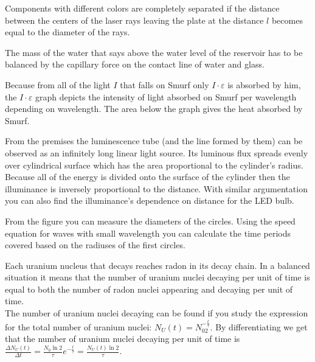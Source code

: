 \documentclass[11pt]{article}
\begin{document}
\hinteng
Components with different colors are completely separated if the distance between the centers of the laser rays leaving the plate at the distance $l$ becomes equal to the diameter of the rays.
\probend
\bigskip


\hinteng
The mass of the water that says above the water level of the reservoir has to be balanced by the capillary force on the contact line of water and glass.
\probend
\bigskip


\hinteng
Because from all of the light $I$ that falls on Smurf only $ I \cdot\varepsilon $ is absorbed by him, the $ I \cdot \varepsilon $ graph depicts the intensity of light absorbed on Smurf per wavelength depending on wavelength. The area below the graph gives the heat absorbed by Smurf.
\probend
\bigskip


\hinteng
From the premises the luminescence tube (and the line formed by them) can be observed as an infinitely long linear light source. Its luminous flux spreads evenly over cylindrical surface which has the area proportional to the cylinder’s radius. Because all of the energy is divided onto the surface of the cylinder then the illuminance is inversely proportional to the distance. With similar argumentation you can also find the illuminance’s dependence on distance for the LED bulb.
\probend
\bigskip


\hinteng
From the figure you can measure the diameters of the circles. Using the speed equation for waves with small wavelength you can calculate the time periods covered based on the radiuses of the first circles.
\probend
\bigskip


\hinteng
Each uranium nucleus that decays reaches radon in its decay chain. In a balanced situation it means that the number of uranium nuclei decaying per unit of time is equal to both the number of radon nuclei appearing and decaying per unit of time.\\
The number of uranium nuclei decaying can be found if you study the expression for the total number of uranium nuclei: $N_U(t) = N_02^{-\frac{t}{\tau}}$. By differentiating we get that the number of uranium nuclei decaying per unit of time is $\frac{\Delta N_U(t)}{\Delta t} = \frac{N_0\ln 2}{\tau}e^{-\frac{t}{\tau}} = \frac{N_U(t)\ln 2}{\tau}$.
\probend
\bigskip
\end{document}
